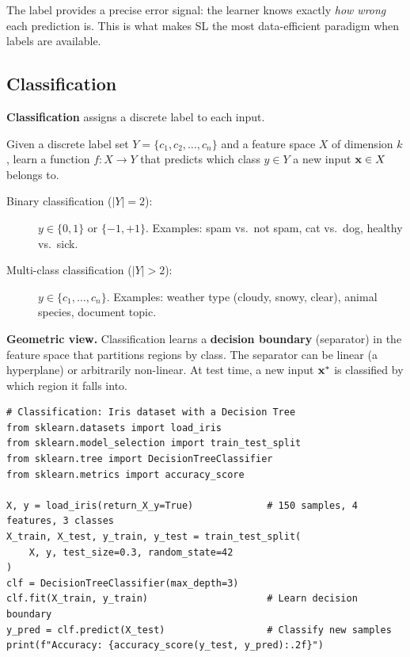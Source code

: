 \begin{remark}
The label provides a precise error signal: the learner knows exactly \emph{how wrong} each prediction is. This is what makes SL the most data-efficient paradigm when labels are available.
\end{remark}

\subsection*{Classification}

\textbf{Classification} assigns a discrete label to each input.

\begin{definition}[Classification]
Given a discrete label set $Y = \{c_1, c_2, \dots, c_n\}$ and a feature space $X$ of dimension $k$, learn a function $f: X \to Y$ that predicts which class $y \in Y$ a new input $\mathbf{x} \in X$ belongs to.
\end{definition}

\begin{description}
    \item[Binary classification ($|Y| = 2$):] $y \in \{0, 1\}$ or $\{-1, +1\}$.
        Examples: spam vs.\ not spam, cat vs.\ dog, healthy vs.\ sick.
    \item[Multi-class classification ($|Y| > 2$):] $y \in \{c_1, \dots, c_n\}$.
        Examples: weather type (cloudy, snowy, clear), animal species, document topic.
\end{description}

\textbf{Geometric view.}
Classification learns a \textbf{decision boundary} (separator) in the feature space that partitions regions by class.
The separator can be linear (a hyperplane) or arbitrarily non-linear.
At test time, a new input $\mathbf{x}^*$ is classified by which region it falls into.

\begin{lstlisting}[style=pythonstyle]
# Classification: Iris dataset with a Decision Tree
from sklearn.datasets import load_iris
from sklearn.model_selection import train_test_split
from sklearn.tree import DecisionTreeClassifier
from sklearn.metrics import accuracy_score

X, y = load_iris(return_X_y=True)             # 150 samples, 4 features, 3 classes
X_train, X_test, y_train, y_test = train_test_split(
    X, y, test_size=0.3, random_state=42
)
clf = DecisionTreeClassifier(max_depth=3)
clf.fit(X_train, y_train)                     # Learn decision boundary
y_pred = clf.predict(X_test)                  # Classify new samples
print(f"Accuracy: {accuracy_score(y_test, y_pred):.2f}")
\end{lstlisting}

